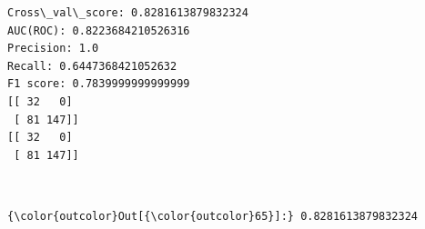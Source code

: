 \documentclass[11pt]{article}
\begin{document}
    \begin{Verbatim}[commandchars=\\\{\}]
Cross\_val\_score: 0.8281613879832324
AUC(ROC): 0.8223684210526316
Precision: 1.0
Recall: 0.6447368421052632
F1 score: 0.7839999999999999
[[ 32   0]
 [ 81 147]]
[[ 32   0]
 [ 81 147]]

    \end{Verbatim}

    \begin{center}
    \end{center}
    { \hspace*{\fill} \\}
    
\begin{Verbatim}[commandchars=\\\{\}]
{\color{outcolor}Out[{\color{outcolor}65}]:} 0.8281613879832324
\end{Verbatim}
            

    
    
    
    
\end{document}
